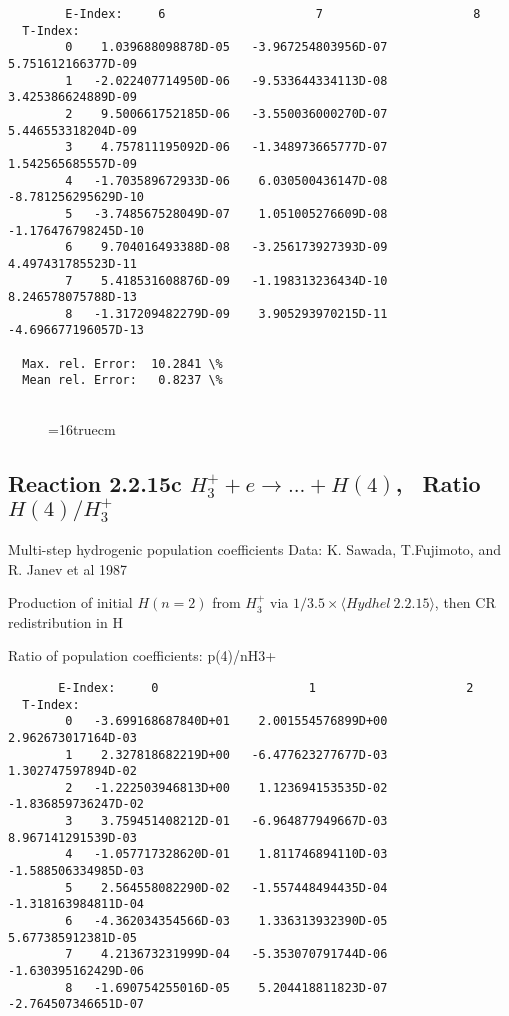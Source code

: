 \documentclass[12pt,dvipdfmx]{article}
\begin{document}
{\begin{small}
\begin{verbatim}
        E-Index:     6                     7                     8
  T-Index:
        0    1.039688098878D-05   -3.967254803956D-07    5.751612166377D-09
        1   -2.022407714950D-06   -9.533644334113D-08    3.425386624889D-09
        2    9.500661752185D-06   -3.550036000270D-07    5.446553318204D-09
        3    4.757811195092D-06   -1.348973665777D-07    1.542565685557D-09
        4   -1.703589672933D-06    6.030500436147D-08   -8.781256295629D-10
        5   -3.748567528049D-07    1.051005276609D-08   -1.176476798245D-10
        6    9.704016493388D-08   -3.256173927393D-09    4.497431785523D-11
        7    5.418531608876D-09   -1.198313236434D-10    8.246578075788D-13
        8   -1.317209482279D-09    3.905293970215D-11   -4.696677196057D-13

  Max. rel. Error:  10.2841 \%
  Mean rel. Error:   0.8237 \%


\end{verbatim}\end{small}
\begin{figure} \label{2.2.15b}
\epsfxsize=16truecm
\end{figure}
\newpage


\subsection{
Reaction 2.2.15c $ H_3^+ + e \rightarrow ...+ H(4) $, \   Ratio $H(4)/H_3^+  $
}

 Multi-step hydrogenic population coefficients
 Data: K. Sawada, T.Fujimoto, \cite{kn:Sawada} and R. Janev et al 1987

 Production of initial $H(n=2)$ from $H_3^+$ via $1/3.5 \times \langle Hydhel~ 2.2.15\rangle$,
 then CR redistribution in H

 Ratio of population coefficients: p(4)/nH3+

\begin{small}\begin{verbatim}
       E-Index:     0                     1                     2
  T-Index:
        0   -3.699168687840D+01    2.001554576899D+00    2.962673017164D-03
        1    2.327818682219D+00   -6.477623277677D-03    1.302747597894D-02
        2   -1.222503946813D+00    1.123694153535D-02   -1.836859736247D-02
        3    3.759451408212D-01   -6.964877949667D-03    8.967141291539D-03
        4   -1.057717328620D-01    1.811746894110D-03   -1.588506334985D-03
        5    2.564558082290D-02   -1.557448494435D-04   -1.318163984811D-04
        6   -4.362034354566D-03    1.336313932390D-05    5.677385912381D-05
        7    4.213673231999D-04   -5.353070791744D-06   -1.630395162429D-06
        8   -1.690754255016D-05    5.204418811823D-07   -2.764507346651D-07


\end{verbatim}
\end{small}}
\end{document}
